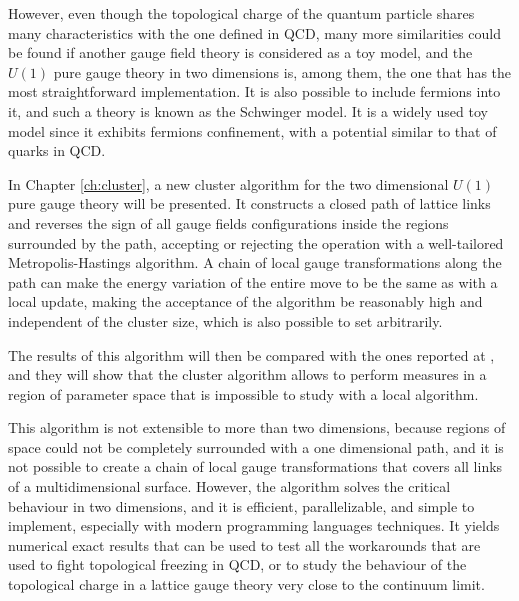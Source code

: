 However, even though the topological charge of the quantum particle shares many characteristics with the one defined in QCD,
many more similarities could be found if another gauge field theory is considered as a toy model,
and the $U(1)$ pure gauge theory in two dimensions is, among them, the one that has the most straightforward implementation.
It is also possible to include fermions into it,
and such a theory is known as the Schwinger model.
It is a widely used toy model since it exhibits fermions confinement,
with a potential similar to that of quarks in QCD.


In Chapter \ref{ch:cluster}, a new cluster algorithm for the two dimensional $U(1)$ pure gauge theory will be presented.
It constructs a closed path of lattice links and reverses the sign of all gauge fields configurations inside the regions surrounded by the path,
accepting or rejecting the operation with a well-tailored Metropolis-Hastings algorithm.
A chain of local gauge transformations along the path can make the energy variation of the entire move to be the same as with a local update,
making the acceptance of the algorithm be reasonably high and independent of the cluster size, which is also possible to set arbitrarily.

The results of this algorithm will then be compared with the ones reported at \cite{durr-hoelbling:2005}, and they will show that the cluster algorithm allows to perform measures in a region of parameter space that is impossible to study with a local algorithm.

This algorithm is not extensible to more than two dimensions,
because regions of space could not be completely surrounded with a one dimensional path,
and it is not possible to create a chain of local gauge transformations that covers all links of a multidimensional surface.
However, the algorithm solves the critical behaviour in two dimensions,
and it is efficient, parallelizable, and simple to implement, especially with modern programming languages techniques.
It yields numerical exact results that can be used to test all the workarounds that are used to fight topological freezing in QCD, or to study the behaviour of the topological charge in a lattice gauge theory very close to the continuum limit. 

